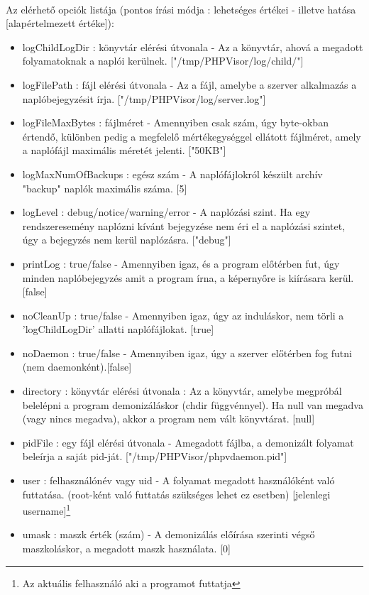 \documentclass[12pt]{report}
\begin{document}
  \paragraph{}
  Az elérhető opciók listája (pontos írási módja : lehetséges értékei - illetve hatása [alapértelmezett értéke]):
  \begin{itemize}
  \item logChildLogDir : könyvtár elérési útvonala - Az a könyvtár, ahová a megadott folyamatoknak a naplói kerülnek. ["/tmp/PHPVisor/log/child/"]
  \item logFilePath : fájl elérési útvonala - Az a fájl, amelybe a szerver alkalmazás a naplóbejegyzésit írja. ["/tmp/PHPVisor/log/server.log"]
  \item logFileMaxBytes : fájlméret - Amennyiben csak szám, úgy byte-okban értendő, különben pedig a megfelelő mértékegységgel ellátott fájlméret, amely a naplófájl maximális méretét jelenti. ["50KB"]
  \item logMaxNumOfBackups : egész szám - A naplófájlokról készült archív "backup" naplók maximális száma. [5]
  \item logLevel : debug/notice/warning/error - A naplózási szint. Ha egy rendszeresemény naplózni kívánt bejegyzése nem éri el a naplózási szintet, úgy a bejegyzés nem kerül naplózásra. ["debug"]
  \item printLog : true/false - Amennyiben igaz, és a program előtérben fut, úgy minden  naplóbejegyzés amit a program írna, a képernyőre is kiírásara kerül. [false]
  \item noCleanUp : true/false - Amennyiben igaz, úgy az induláskor, nem törli a 'logChildLogDir' allatti naplófájlokat. [true]
  \item noDaemon : true/false - Amennyiben igaz, úgy a szerver előtérben fog futni (nem daemonként).[false]
  \item directory : könyvtár elérési útvonala : Az a könyvtár, amelybe megpróbál belelépni a program demonizáláskor (chdir függvénnyel). Ha null van megadva (vagy nincs megadva), akkor a program nem vált könyvtárat. [null]
  \item pidFile : egy fájl elérési útvonala - Amegadott fájlba, a demonizált folyamat beleírja a saját pid-ját. ["/tmp/PHPVisor/phpvdaemon.pid"]
  \item user : felhasználónév vagy uid - A folyamat megadott használóként való futtatása. (root-ként való futtatás szükséges lehet ez esetben) [jelenlegi username]\footnote{Az aktuális felhasználó aki a programot futtatja}
  \item umask : maszk érték (szám) - A demonizálás előírása szerinti végső maszkoláskor, a megadott maszk használata. [0]
  \end{itemize}
\end{document}
